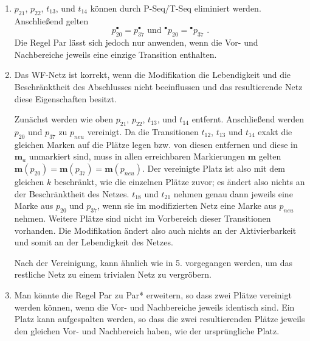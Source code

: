 \documentclass[a4paper]{scrartcl}
\begin{document}
\begin{enumerate}
    \item
        $p_{21}$, $p_{22}$, $t_{13}$, und $t_{14}$ können durch P-Seq/T-Seq
        eliminiert werden.
        Anschließend gelten
        \begin{equation}
            p_{20}^\bullet = p_{37}^\bullet
            \text{ und }
            {}^\bullet p_{20} = {}^\bullet p_{37}
            \text{ .}
            \label{eq:par*}
        \end{equation}
        Die Regel Par lässt sich jedoch nur anwenden, wenn die Vor- und
        Nachbereiche jeweils eine einzige Transition enthalten.
        

    \item
        Das WF-Netz ist korrekt, wenn die Modifikation die Lebendigkeit und die
        Beschränktheit des Abschlusses nicht beeinflussen und das resultierende
        Netz diese Eigenschaften besitzt.

        Zunächst werden wie oben $p_{21}$, $p_{22}$, $t_{13}$, und $t_{14}$
        entfernt.
        Anschließend werden $p_{20}$ und $p_{37}$ zu $p_{neu}$ vereinigt.
        Da die Transitionen $t_{12}$, $t_{13}$ und $t_{14}$ exakt die gleichen
        Marken auf die Plätze legen bzw. von diesen entfernen und diese in
        $\textbf{m}_a$ unmarkiert sind, muss in allen erreichbaren Markierungen
        $\textbf{m}$ gelten
        $\textbf{m}(p_{20}) = \textbf{m}(p_{37}) = \textbf{m}(p_{neu})$.
        Der vereinigte Platz ist also mit dem gleichen $k$ beschränkt, wie die
        einzelnen Plätze zuvor; es ändert also nichts an der Beschränktheit des
        Netzes.
        $t_{18}$ und $t_{21}$ nehmen genau dann jeweils eine Marke aus $p_{20}$
        und $p_{37}$, wenn sie im modifizierten Netz eine Marke aus $p_{neu}$
        nehmen.
        Weitere Plätze sind nicht im Vorbereich dieser Transitionen vorhanden.
        Die Modifikation ändert also auch nichts an der Aktivierbarkeit und
        somit an der Lebendigkeit des Netzes.

        Nach der Vereinigung, kann ähnlich wie in 5. vorgegangen werden, um das
        restliche Netz zu einem trivialen Netz zu vergröbern.

    \item
        Man könnte die Regel Par zu Par* erweitern, so dass zwei Plätze
        vereinigt werden können, wenn die Vor- und Nachbereiche jeweils
        identisch sind.
        Ein Platz kann aufgespalten werden, so dass die zwei resultierenden
        Plätze jeweils den gleichen Vor- und Nachbereich haben, wie der
        ursprüngliche Platz.

\end{enumerate}
\end{document}

